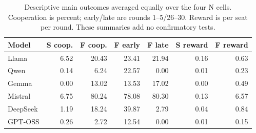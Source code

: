 \begin{table}[t]
\centering
\small
\setlength{\tabcolsep}{4pt}
\begin{tabular}{lrrrrrr}
\toprule
Model & S coop. & F coop. & F early & F late & S reward & F reward \\
\midrule
Llama & 6.52 & 20.43 & 23.41 & 21.94 & 0.16 & 0.63 \\
Qwen & 0.14 & 6.24 & 22.57 & 0.00 & 0.01 & 0.23 \\
Gemma & 0.00 & 13.02 & 13.53 & 17.02 & 0.00 & 0.49 \\
Mistral & 6.75 & 80.24 & 78.08 & 80.30 & 0.13 & 6.57 \\
DeepSeek & 1.19 & 18.24 & 39.87 & 2.79 & 0.04 & 0.84 \\
GPT-OSS & 0.26 & 2.72 & 12.54 & 0.00 & 0.01 & 0.15 \\
\bottomrule
\end{tabular}
\caption{Descriptive main outcomes averaged equally over the four N cells. Cooperation is percent; early/late are rounds 1--5/26--30. Reward is per seat per round. These summaries add no confirmatory tests.}
\label{tab:main-outcomes}
\end{table}
